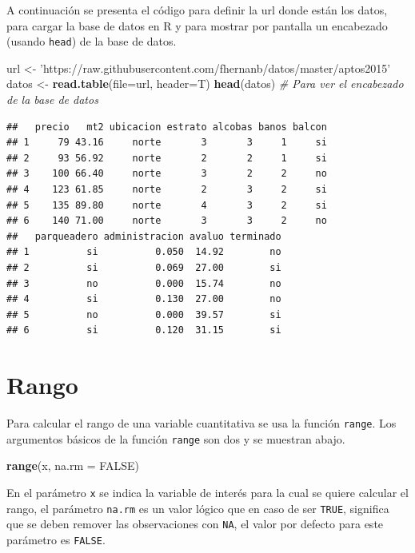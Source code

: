 \documentclass[10pt,]{krantz}
\makeatletter
\newenvironment{Shaded}{\begin{snugshade}}{\end{snugshade}}
\newcommand{\KeywordTok}[1]{\textcolor[rgb]{0.13,0.29,0.53}{\textbf{{#1}}}}
\newcommand{\DataTypeTok}[1]{\textcolor[rgb]{0.13,0.29,0.53}{{#1}}}
\newcommand{\StringTok}[1]{\textcolor[rgb]{0.31,0.60,0.02}{{#1}}}
\newcommand{\CommentTok}[1]{\textcolor[rgb]{0.56,0.35,0.01}{\textit{{#1}}}}
\newcommand{\OtherTok}[1]{\textcolor[rgb]{0.56,0.35,0.01}{{#1}}}
\newcommand{\NormalTok}[1]{{#1}}
\newenvironment{kframe}{%
\medskip{}
\setlength{\fboxsep}{.8em}
 \def\at@end@of@kframe{}%
 \ifinner\ifhmode%
  \def\at@end@of@kframe{\end{minipage}}%
  \begin{minipage}{\columnwidth}%
 \fi\fi%
 \def\FrameCommand##1{\hskip\@totalleftmargin \hskip-\fboxsep
 \colorbox{shadecolor}{##1}\hskip-\fboxsep
     \hskip-\linewidth \hskip-\@totalleftmargin \hskip\columnwidth}%
 \MakeFramed {\advance\hsize-\width
   \@totalleftmargin\z@ \linewidth\hsize
   \@setminipage}}%
 {\par\unskip\endMakeFramed%
 \at@end@of@kframe}
\renewenvironment{Shaded}{\begin{kframe}}{\end{kframe}}
\makeatother
\begin{document}
A continuación se presenta el código para definir la url donde están los
datos, para cargar la base de datos en R y para mostrar por pantalla un
encabezado (usando \texttt{head}) de la base de datos.

\begin{Shaded}
\begin{Highlighting}[]
\NormalTok{url <-}\StringTok{ 'https://raw.githubusercontent.com/fhernanb/datos/master/aptos2015'}
\NormalTok{datos <-}\StringTok{ }\KeywordTok{read.table}\NormalTok{(}\DataTypeTok{file=}\NormalTok{url, }\DataTypeTok{header=}\NormalTok{T)}
\KeywordTok{head}\NormalTok{(datos)  }\CommentTok{# Para ver el encabezado de la base de datos}
\end{Highlighting}
\end{Shaded}

\begin{verbatim}
##   precio   mt2 ubicacion estrato alcobas banos balcon
## 1     79 43.16     norte       3       3     1     si
## 2     93 56.92     norte       2       2     1     si
## 3    100 66.40     norte       3       2     2     no
## 4    123 61.85     norte       2       3     2     si
## 5    135 89.80     norte       4       3     2     si
## 6    140 71.00     norte       3       3     2     no
##   parqueadero administracion avaluo terminado
## 1          si          0.050  14.92        no
## 2          si          0.069  27.00        si
## 3          no          0.000  15.74        no
## 4          si          0.130  27.00        no
## 5          no          0.000  39.57        si
## 6          si          0.120  31.15        si
\end{verbatim}

\section{\texorpdfstring{Rango 
}{Rango  }}\label{rango}

Para calcular el rango de una variable cuantitativa se usa la función
\texttt{range}. Los argumentos básicos de la función \texttt{range} son
dos y se muestran abajo.

\begin{Shaded}
\begin{Highlighting}[]
\KeywordTok{range}\NormalTok{(x, }\DataTypeTok{na.rm =} \OtherTok{FALSE}\NormalTok{)}
\end{Highlighting}
\end{Shaded}

En el parámetro \texttt{x} se indica la variable de interés para la cual
se quiere calcular el rango, el parámetro \texttt{na.rm} es un valor
lógico que en caso de ser \texttt{TRUE}, significa que se deben remover
las observaciones con \texttt{NA}, el valor por defecto para este
parámetro es \texttt{FALSE}.
\end{document}
